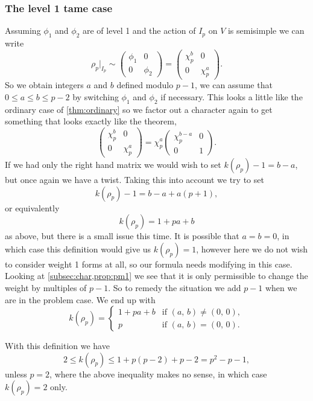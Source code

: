 \documentclass[a4paper,12pt]{article}
\begin{document}
\subsubsection{The level 1 tame case}\label{sec:l1t}
Assuming $\phi_1$ and $\phi_2$ are of level 1 and the action of $I_p$ on $V$ is semisimple we can write
\[
\rho_p |_{I_p} \sim \begin{pmatrix}
\phi_1 & 0 \\
0      & \phi_2 \end{pmatrix} = \begin{pmatrix}
\chi_p^b & 0 \\
0      & \chi_p^a \end{pmatrix}.
\]
So we obtain integers $a$ and $b$ defined modulo $p-1$, we can assume that $0\le a \le b \le p-2$ by switching $\phi_1$ and $\phi_2$ if necessary.
This looks a little like the ordinary case of \cref{thm:ordinary} so we factor out a character again to get something that looks exactly like the theorem,
\[
\begin{pmatrix}
\chi_p^b & 0 \\
0        & \chi_p^a \end{pmatrix}=
\chi_p^a\begin{pmatrix}
\chi_p^{b-a} & 0 \\
0            & 1 \end{pmatrix}.
\]
If we had only the right hand matrix we would wish to set $k(\rho_p) - 1 = b-a$, but once again we have a twist.
Taking this into account we try to set
\[
k(\rho_p) - 1 = b - a + a(p+1),
\]
or equivalently
\[
k(\rho_p) = 1 + pa + b
\]
as above, but there is a small issue this time.
It is possible that $a = b = 0$, in which case this definition would give us $k(\rho_p) = 1$, however here we do not wish to consider weight 1 forms at all, so our formula needs modifying in this case.
Looking at \cref{subsec:char,prop:pm1} we see that it is only permissible to change the weight by multiples of $p-1$.
So to remedy the situation we add $p-1$ when we are in the problem case.
We end up with %
\begin{equation}\label{eq:l1t}
k(\rho_p) = \begin{cases}
1 + pa + b & \text{if }(a,\,b) \ne (0,\,0), \\
         p & \text{if }(a,\,b) = (0,\,0).
\end{cases}
\end{equation}

With this definition we have
\[
2\le k(\rho_p) \le 1 + p(p-2) + p-2 = p^2 - p - 1,
\]
unless $p = 2$, where the above inequality makes no sense, in which case $k(\rho_p) = 2$ only.
\end{document}
